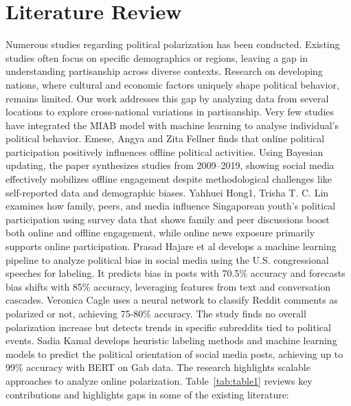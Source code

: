 \documentclass[pt]{article}  %
\begin{document}
\section{Literature Review}
Numerous studies regarding political polarization has been conducted. Existing studies often focus on specific demographics or regions, leaving a gap in understanding partisanship across diverse contexts. Research on developing nations, where cultural and economic factors uniquely shape political behavior, remains limited. Our work addresses this gap by analyzing data from several locations to explore cross-national variations in partisanship. Very few studies have integrated the MIAB model with machine learning to analyse individual's political behavior. Emese, Angya and Zita Fellner \cite{ref6} finds that online political participation positively influences offline political activities. Using Bayesian updating, the paper synthesizes studies from 2009–2019, showing social media effectively mobilizes offline engagement despite methodological challenges like self-reported data and demographic biases. Yahhuei Hong1, Trisha T. C. Lin \cite{ref7} examines how family, peers, and media influence Singaporean youth's political participation using survey data that shows family and peer discussions boost both online and offline engagement, while online news exposure primarily supports online participation. Prasad Hajare et al \cite{ref8} develops a machine learning pipeline to analyze political bias in social media using the U.S. congressional speeches for labeling. It predicts bias in posts with 70.5\% accuracy and forecasts bias shifts with 85\% accuracy, leveraging features from text and conversation cascades. Veronica Cagle \cite{ref15} uses a neural network to classify Reddit comments as polarized or not, achieving 75-80\% accuracy. The study finds no overall polarization increase but detects trends in specific subreddits tied to political events. Sadia Kamal \cite{ref10} develops heuristic labeling methods and machine learning models to predict the political orientation of social media posts, achieving up to 99\% accuracy with BERT on Gab data. The research highlights scalable approaches to analyze online polarization. Table~\ref{tab:table1} reviews key contributions and highlights gaps in some of the existing literature:
\end{document}
